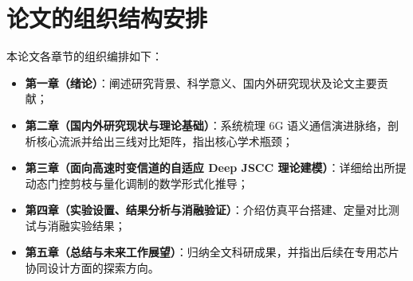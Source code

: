 \section{论文的组织结构安排}
本论文各章节的组织编排如下：
\begin{itemize}
  \item \textbf{第一章（绪论）}：阐述研究背景、科学意义、国内外研究现状及论文主要贡献；
  \item \textbf{第二章（国内外研究现状与理论基础）}：系统梳理 6G 语义通信演进脉络，剖析核心流派并给出三线对比矩阵，指出核心学术瓶颈；
  \item \textbf{第三章（面向高速时变信道的自适应 Deep JSCC 理论建模）}：详细给出所提动态门控剪枝与量化调制的数学形式化推导；
  \item \textbf{第四章（实验设置、结果分析与消融验证）}：介绍仿真平台搭建、定量对比测试与消融实验结果；
  \item \textbf{第五章（总结与未来工作展望）}：归纳全文科研成果，并指出后续在专用芯片协同设计方面的探索方向。
\end{itemize}
